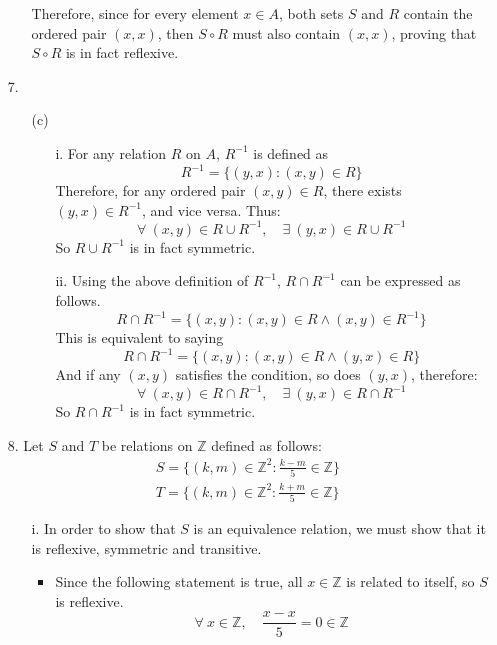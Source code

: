 \documentclass[fleqn]{article}
\begin{document}
\begin{enumerate}
\begin{enumerate}
		Therefore, since for every element \(x \in A\), both sets \(S\) and \(R\) contain the ordered pair \((x, x)\), then \(S \circ R\) must also contain \((x, x)\), proving that \(S \circ R\) is in fact reflexive.
	\end{enumerate}

	\item[7.]
	\begin{enumerate}
		\item[(c)]
		\begin{enumerate}
			\item[i.]
			For any relation \(R\) on \(A\), \(R^{-1}\) is defined as
			\[R^{-1} = \{(y, x) : (x, y) \in R\}\]
			Therefore, for any ordered pair \((x, y) \in R\), there exists \((y, x) \in R^{-1}\), and vice versa. Thus:
			\[\forall \ (x, y) \in R \cup R^{-1}, \quad \exists \ (y, x) \in R \cup R^{-1}\]
			So \(R \cup R^{-1}\) is in fact symmetric.

			\item[ii.]
			Using the above definition of \(R^{-1}\), \(R \cap R^{-1}\) can be expressed as follows.
			\[R \cap R^{-1} = \{(x, y) : (x, y) \in R \land (x, y) \in R^{-1}\}\]
			This is equivalent to saying
			\[R \cap R^{-1} = \{(x, y) : (x, y) \in R \land (y, x) \in R\}\]
			And if any \((x, y)\) satisfies the condition, so does \((y, x)\), therefore:
			\[\forall \ (x, y) \in R \cap R^{-1}, \quad \exists \ (y, x) \in R \cap R^{-1}\]
			So \(R \cap R^{-1}\) is in fact symmetric.
		\end{enumerate}
	\end{enumerate}

	\item[8.]
	Let \(S\) and \(T\) be relations on \(\mathbb{Z}\) defined as follows:
	\begin{gather*}
		S = \{(k, m) \in \mathbb{Z}^{2} : \frac{k - m}{5} \in \mathbb{Z}\} \\
		T = \{(k, m) \in \mathbb{Z}^{2} : \frac{k + m}{5} \in \mathbb{Z}\}
	\end{gather*}

	\begin{enumerate}
		\item[i.]
		In order to show that \(S\) is an equivalence relation, we must show that it is reflexive, symmetric and transitive.

		\begin{itemize}
			\item
			Since the following statement is true, all \(x \in \mathbb{Z}\) is related to itself, so \(S\) is reflexive.
			\[\forall \ x \in \mathbb{Z}, \quad \frac{x - x}{5} = 0 \in \mathbb{Z}\]


\end{itemize}
\end{enumerate}
\end{enumerate}
\end{document}
